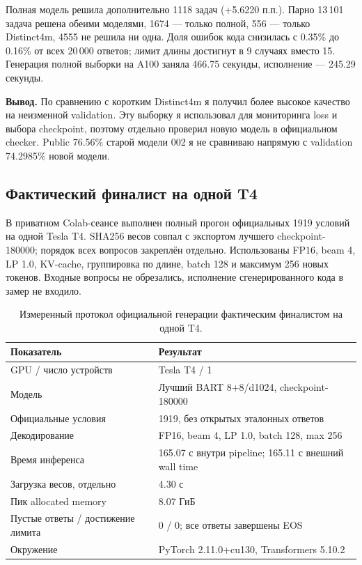 \begin{table}[htbp]
\centering\small
\caption{Короткий Distinct4m и полностью обученный BART на одной
Val-20k. Бюджеты обучения различаются; это сравнение итоговых
конфигураций, а не опыт с одинаковым числом предъявлений.}
\label{tab:fullquality}
\end{table}

Полная модель решила дополнительно 1118 задач (+5.6220 п.п.).
Парно 13\,101 задача решена обеими моделями, 1674 --- только полной,
556 --- только Distinct4m, 4555 не решила ни одна.
Доля ошибок кода снизилась с 0.35\% до 0.16\% от всех 20\,000 ответов;
лимит длины достигнут в 9 случаях вместо 15.
Генерация полной выборки на A100 заняла 466.75 секунды,
исполнение --- 245.29 секунды.

\textbf{Вывод.} По сравнению с коротким Distinct4m я получил более высокое
качество на неизменной validation. Эту выборку я использовал
для мониторинга loss и выбора checkpoint, поэтому отдельно проверил
новую модель в официальном checker. Public 76.56\% старой модели 002
я не сравниваю напрямую с validation 74.2985\% новой модели.

\subsection{Фактический финалист на одной T4}
В приватном Colab-сеансе выполнен полный прогон официальных 1919
условий на одной Tesla T4. SHA256 весов совпал с экспортом лучшего
checkpoint-180000; порядок всех вопросов закреплён отдельно.
Использованы FP16, beam 4, LP 1.0, KV-cache, группировка по длине,
batch 128 и максимум 256 новых токенов. Входные вопросы не обрезались,
исполнение сгенерированного кода в замер не входило.

\begin{table}[htbp]
\centering\small
\begin{tabularx}{\linewidth}{lX}
\toprule
Показатель & Результат \\
\midrule
GPU / число устройств & Tesla T4 / 1 \\
Модель & Лучший BART 8+8/d1024, checkpoint-180000 \\
Официальные условия & 1919, без открытых эталонных ответов \\
Декодирование & FP16, beam 4, LP 1.0, batch 128, max 256 \\
Время инференса & 165.07 с внутри pipeline; 165.11 с внешний wall time \\
Загрузка весов, отдельно & 4.30 с \\
Пик allocated memory & 8.07 ГиБ \\
Пустые ответы / достижение лимита & 0 / 0; все ответы завершены EOS \\
Окружение & PyTorch 2.11.0+cu130, Transformers 5.10.2 \\
\bottomrule
\end{tabularx}
\caption{Измеренный протокол официальной генерации фактическим
финалистом на одной T4.}
\end{table}

